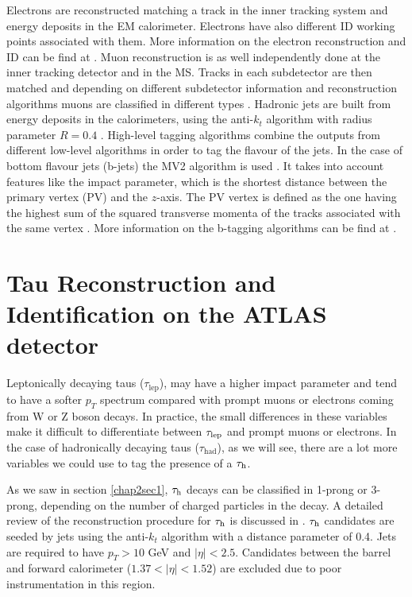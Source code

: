 Electrons are reconstructed matching a track in the inner tracking system and energy deposits in the EM calorimeter. Electrons have also different ID working points associated with them. More information on the electron reconstruction and ID can be find at \cite{Aaboud:2019ynx}. Muon reconstruction is as well independently done at the inner tracking detector and in the MS. Tracks in each subdetector are then matched and depending on different subdetector information and reconstruction algorithms muons are classified in different types \cite{Aad:2016jkr}. Hadronic jets are built from energy deposits in the calorimeters, using the anti-$k_t$ algorithm with radius parameter $R=0.4$ \cite{Cacciari:2008gp}. High-level tagging algorithms combine the outputs from different low-level algorithms in order to tag the flavour of the jets. In the case of bottom flavour jets (b-jets) the MV2 algorithm is used \cite{ATLAS:2017bcq}. It takes into account features like the impact parameter, which is the shortest distance between the primary vertex (PV) and the $z$-axis. The PV vertex is defined as the one having the highest sum of the squared transverse momenta of the tracks associated with the same vertex \cite{Aaboud:2016rmg,TheATLAScollaboration:2015hdc}. More information on the b-tagging algorithms can be find at \cite{Aad:2019aic}.
  
\section{Tau Reconstruction and Identification on the ATLAS detector}
Leptonically decaying taus ($\tau_\text{lep}$), may have a higher impact parameter and tend to have a softer $p_T$ spectrum compared with prompt muons or electrons coming from W or Z boson decays. In practice, the small differences in these variables make it difficult to differentiate between $\tau_\text{lep}$ and prompt muons or electrons. In the case of hadronically decaying taus ($\tau_\text{had}$), as we will see, there are a lot more variables we could use to tag the presence of a $\tau_\text{h}$.

As we saw in section \ref{chap2sec1}, $\tau_\text{h}$ decays can be classified in 1-prong or 3-prong, depending on the number of charged particles in the decay. A detailed review of the reconstruction procedure for $\tau_\text{h}$ is discussed in \cite{Aad:2014rga}. $\tau_\text{h}$ candidates are seeded by jets using the anti-$k_t$ algorithm \cite{Cacciari:2008gp} with a distance parameter of 0.4. Jets are required to have $p_T>10$ GeV and $|\eta|<2.5$. Candidates between the barrel and forward calorimeter ($1.37<|\eta|<1.52$) are excluded due to poor instrumentation in this region.

